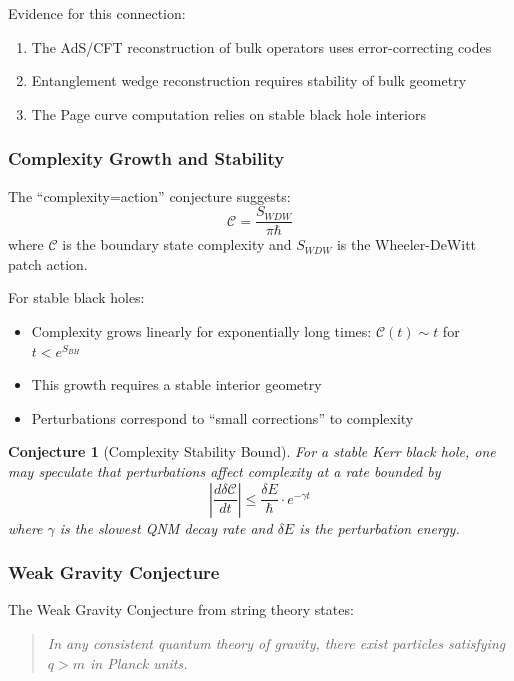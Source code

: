 \documentclass[12pt,a4paper]{article}
\newtheorem{conjecture}[theorem]{Conjecture}
\begin{document}
Evidence for this connection:
\begin{enumerate}
    \item The AdS/CFT reconstruction of bulk operators uses error-correcting codes
    \item Entanglement wedge reconstruction requires stability of bulk geometry
    \item The Page curve computation relies on stable black hole interiors
\end{enumerate}

\subsubsection{Complexity Growth and Stability}

The ``complexity=action'' conjecture suggests:
\begin{equation}
\mathcal{C} = \frac{S_{WDW}}{\pi\hbar}
\end{equation}
where $\mathcal{C}$ is the boundary state complexity and $S_{WDW}$ is the Wheeler-DeWitt patch action.

For stable black holes:
\begin{itemize}
    \item Complexity grows linearly for exponentially long times: $\mathcal{C}(t) \sim t$ for $t < e^{S_{BH}}$
    \item This growth requires a stable interior geometry
    \item Perturbations correspond to ``small corrections'' to complexity
\end{itemize}

\begin{conjecture}[Complexity Stability Bound]
For a stable Kerr black hole, one may speculate that perturbations affect complexity at a rate bounded by
\begin{equation}
\left|\frac{d\delta\mathcal{C}}{dt}\right| \leq \frac{\delta E}{\hbar} \cdot e^{-\gamma t}
\end{equation}
where $\gamma$ is the slowest QNM decay rate and $\delta E$ is the perturbation energy.
\end{conjecture}

\subsubsection{Weak Gravity Conjecture}

The Weak Gravity Conjecture from string theory states:
\begin{quote}
\textit{In any consistent quantum theory of gravity, there exist particles satisfying $q > m$ in Planck units.}
\end{quote}
\end{document}
